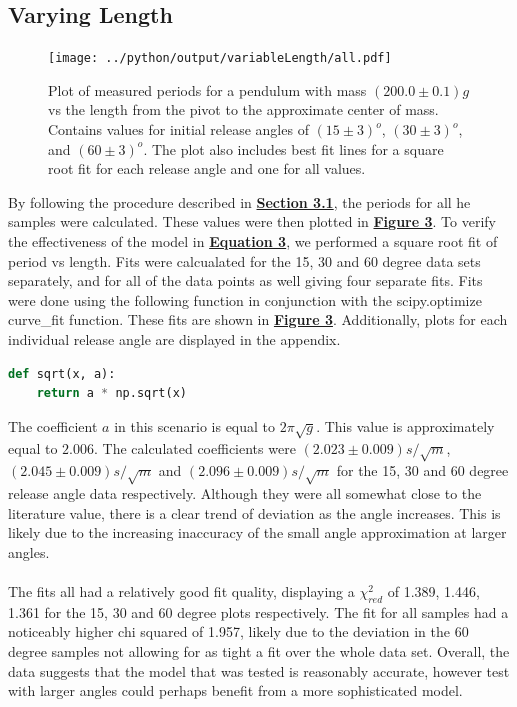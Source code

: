 \documentclass[
	letterpaper
	12pt
]{template}
\newcommand{\bref}[2]{\textbf{\hyperref[#1]{#2}}}
\begin{document}
\subsection{Varying Length}
\begin{figure}\label{plt::length}
	\vspace{-20pt}
	\centering
		\texttt{[image: ../python/output/variableLength/all.pdf]}
		\caption{Plot of measured periods for a pendulum with mass $(200.0\pm0.1)\unit{g}$ vs the length from the pivot to the approximate center of mass. Contains values for initial release angles of $(15\pm 3)^o$, $(30\pm 3)^o$, and $(60\pm 3)^o$. The plot also includes best fit lines for a square root fit for each release angle and one for all values.}
\end{figure}
By following the procedure described in \bref{uncertainty}{Section 3.1}, the periods for all he samples were calculated. These values were then plotted in \bref{plt::length}{Figure 3}. To verify the effectiveness of the model in \bref{eqn::omegaValue}{Equation 3}, we performed a square root fit of period vs length. Fits were calcualated for the 15, 30 and 60 degree data sets separately, and for all of the data points as well giving four separate fits. Fits were done using the following function in conjunction with the scipy.optimize curve\_fit function. These fits are shown in \bref{plt::length}{Figure 3}. Additionally, plots for each individual release angle are displayed in the appendix.

\begin{lstlisting}[label={func::sqrt}, captionpos=b,language=python]
def sqrt(x, a):
	return a * np.sqrt(x)
\end{lstlisting}

The coefficient $a$ in this scenario is equal to $2\pi  \sqrt g$. This value is approximately equal to $2.006$. The calculated coefficients were $(2.023 \pm 0.009)\unit{s\per\sqrt{m}}$, $(2.045 \pm 0.009)\unit{s\per\sqrt{m}}$ and $(2.096 \pm 0.009)\unit{s\per\sqrt{m}}$ for the 15, 30 and 60 degree release angle data respectively. Although they were all somewhat close to the literature value, there is a clear trend of deviation as the angle increases. This is likely due to the increasing inaccuracy of the small angle approximation at larger angles.\\\\
The fits all had a relatively good fit quality, displaying a $\chi_{red}^2$ of 1.389, 1.446, 1.361 for the 15, 30 and 60 degree plots respectively. The fit for all samples had a noticeably higher chi squared of 1.957, likely due to the deviation in the 60 degree samples not allowing for as tight a fit over the whole data set. Overall, the data suggests that the model that was tested is reasonably accurate, however test with larger angles could perhaps benefit from a more sophisticated model.
\end{document}
